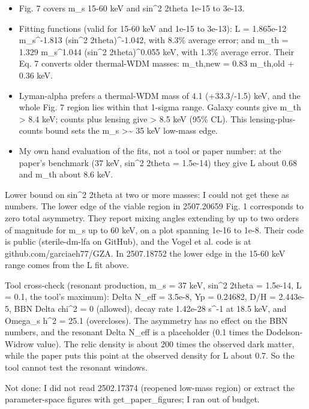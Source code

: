 \documentclass[11pt,a4paper]{article}
\begin{document}
\begin{itemize}
  \item Fig. 7 covers m\_s 15-60 keV and sin\textasciicircum{}2 2theta 1e-15 to 3e-13.
  \item Fitting functions (valid for 15-60 keV and 1e-15 to 3e-13): L = 1.865e-12 m\_s\textasciicircum{}-1.813 (sin\textasciicircum{}2 2theta)\textasciicircum{}-1.042, with 8.3\% average error; and m\_th = 1.329 m\_s\textasciicircum{}1.044 (sin\textasciicircum{}2 2theta)\textasciicircum{}0.055 keV, with 1.3\% average error. Their Eq. 7 converts older thermal-WDM masses: m\_th,new = 0.83 m\_th,old + 0.36 keV.
  \item Lyman-alpha prefers a thermal-WDM mass of 4.1 (+33.3/-1.5) keV, and the whole Fig. 7 region lies within that 1-sigma range. Galaxy counts give m\_th \textgreater{} 8.4 keV; counts plus lensing give \textgreater{} 8.5 keV (95\% CL). This lensing-plus-counts bound sets the m\_s \textgreater{}\textasciitilde{} 35 keV low-mass edge.
  \item My own hand evaluation of the fits, not a tool or paper number: at the paper's benchmark (37 keV, sin\textasciicircum{}2 2theta = 1.5e-14) they give L about 0.68 and m\_th about 8.6 keV.
\end{itemize}
Lower bound on sin\textasciicircum{}2 2theta at two or more masses: I could not get these as numbers. The lower edge of the viable region in 2507.20659 Fig. 1 corresponds to zero total asymmetry. They report mixing angles extending by up to two orders of magnitude for m\_s up to 60 keV, on a plot spanning 1e-16 to 1e-8. Their code is public (sterile-dm-lfa on GitHub), and the Vogel et al. code is at github.com/garciaeh77/GZA. In 2507.18752 the lower edge in the 15-60 keV range comes from the L fit above.

Tool cross-check (resonant production, m\_s = 37 keV, sin\textasciicircum{}2 2theta = 1.5e-14, L = 0.1, the tool's maximum): Delta N\_eff = 3.5e-8, Yp = 0.24682, D/H = 2.443e-5, BBN Delta chi\textasciicircum{}2 = 0 (allowed), decay rate 1.42e-28 s\textasciicircum{}-1 at 18.5 keV, and Omega\_s h\textasciicircum{}2 = 25.1 (overcloses). The asymmetry has no effect on the BBN numbers, and the resonant Delta N\_eff is a placeholder (0.1 times the Dodelson-Widrow value). The relic density is about 200 times the observed dark matter, while the paper puts this point at the observed density for L about 0.7. So the tool cannot test the resonant windows.

Not done: I did not read 2502.17374 (reopened low-mass region) or extract the parameter-space figures with get\_paper\_figures; I ran out of budget.
\end{document}

